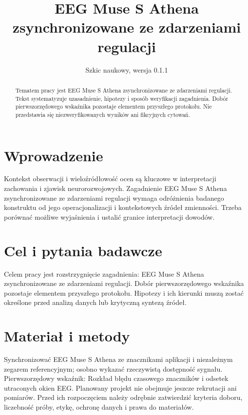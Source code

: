 \documentclass[11pt,a4paper]{article}
\title{EEG Muse S Athena zsynchronizowane ze zdarzeniami regulacji}
\author{}
\date{Szkic naukowy, wersja 0.1.1}
\begin{document}
\maketitle

\begin{abstract}

Tematem pracy jest EEG Muse S Athena zsynchronizowane ze zdarzeniami regulacji. Tekst systematyzuje uzasadnienie, hipotezy i sposób weryfikacji zagadnienia. Dobór pierwszorzędowego wskaźnika pozostaje elementem przyszłego protokołu. Nie przedstawia się niezweryfikowanych wyników ani fikcyjnych cytowań.

\end{abstract}

\section{Wprowadzenie}

Kontekst obserwacji i wieloźródłowość ocen są kluczowe w interpretacji zachowania i zjawisk neurorozwojowych. Zagadnienie EEG Muse S Athena zsynchronizowane ze zdarzeniami regulacji wymaga odróżnienia badanego konstruktu od jego operacjonalizacji i kontekstowych źródeł zmienności. Trzeba porównać możliwe wyjaśnienia i ustalić granice interpretacji dowodów.

\section{Cel i pytania badawcze}

Celem pracy jest rozstrzygnięcie zagadnienia: EEG Muse S Athena zsynchronizowane ze zdarzeniami regulacji. Dobór pierwszorzędowego wskaźnika pozostaje elementem przyszłego protokołu. Hipotezy i ich kierunki muszą zostać określone przed analizą danych lub krytyczną syntezą źródeł.

\section{Materiał i metody}

Synchronizować EEG Muse S Athena ze znacznikami aplikacji i niezależnym zegarem referencyjnym; osobno wykazać rzeczywistą dostępność sygnału. Pierwszorzędowy wskaźnik: Rozkład błędu czasowego znaczników i odsetek utraconych okien EEG. Planowany projekt nie obejmuje jeszcze rekrutacji ani pomiarów. Przed ich rozpoczęciem należy odrębnie zatwierdzić kryteria doboru, liczebność próby, etykę, ochronę danych i prawa do materiałów.
\end{document}
